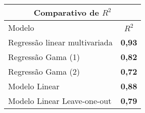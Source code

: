 \documentclass{article}
\begin{document}

\begin{table}[]
	\centering
	\begin{tabular}{lc}
		\hline
		\multicolumn{2}{c}{\textbf{Comparativo de $R^{2}$}} \\ \hline
		Modelo                         & \textbf{$R^{2}$}   \\ \hline
		Regressão linear multivariada                  & \textbf{0,93}      \\
		Regressão Gama (1)         	 & \textbf{0,82}      \\
		Regressão Gama (2)         	 & \textbf{0,72}      \\
		Modelo Linear                  & \textbf{0,88}      \\
		Modelo Linear Leave-one-out    & \textbf{0,79}      \\ \hline 
	\end{tabular}
\end{table}
\end{document}
